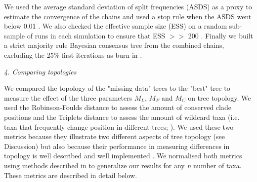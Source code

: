 \documentclass[12pt,letterpaper]{article}
\renewcommand{\subsection}[1]{%
\bigskip
\begin{center}
\begin{large}
\normalfont\itshape #1
\end{large}
\end{center}}
\begin{document}
We used the average standard deviation of split frequencies (ASDS) as a proxy to estimate the convergence of the chains and used a stop rule when the ASDS went below 0.01 \citep{Ronquist2012mrbayes}. We also checked the effective sample size (ESS) on a random sub-sample of runs in each simulation to ensure that ESS $>>$ 200 \citep{drummond2006ess}. Finally we built a strict majority rule Bayesian consensus tree from the combined chains, excluding the 25\% first iterations as burn-in \citep{Ronquist2012mrbayes}.

\subsection{4. Comparing topologies}
We compared the topology of the "missing-data" trees to the "best" tree to measure the effect of the three parameters $M_{L}$, $M_{F}$ and $M_{C}$ on tree topology. We used the Robinson-Foulds distance \citep{RF1981} to assess the amount of conserved clade positions and the Triplets distance \citep{dobson1975triplets} to assess the amount of wildcard taxa (i.e. taxa that frequently change position in different trees; \citealt{kearneyfragmentary2002}). We used these two metrics because they illustrate two different aspects of tree topology (see Discussion) but also because their performance in measuring differences in topology is well described \citep{Kuhner04112014} and well implemented \citep{Bogdanowicz2012}. We normalised both metrics using methods described in \citet{Bogdanowicz2012} to generalize our results for any \textit{n} number of taxa. These metrics are described in detail below.
\end{document}
